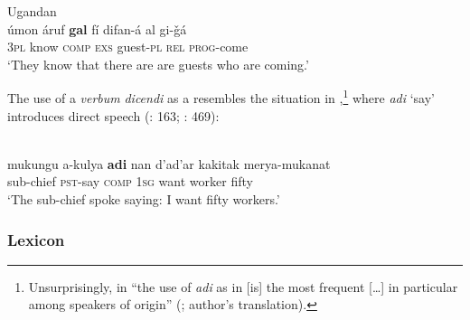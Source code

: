\documentclass[output=paper]{langsci/langscibook}
\begin{document}
\ex
Ugandan  \citep[204]{Wellens2003}\\
\gll     úmon áruf \textbf{gal} fí difan-á al gi-ǧá\\
         3\textsc{pl} know \textsc{comp} \textsc{exs} guest-\textsc{pl} \textsc{rel} \textsc{prog}-come\\
\glt    `They know that there are are guests who are coming.' 
\z
\z

The use of a \textit{verbum} \textit{dicendi} as a  resembles the situation in ,\footnote{Unsurprisingly, in   “the use of \textit{adi} as in  [is] the most frequent […] in particular among speakers of  origin” (\citealt[470]{Miller2001}; author's translation).} where \textit{adi} ‘say’ introduces direct speech (\citealt{Owens1997}: 163; \citealt{Miller2001}: 469): 

\ea

{ \citep[469]{Miller2001}}\\
\gll    mukungu a-kulya \textbf{adi} nan d'ad'ar kakitak merya-mukanat\\
                sub-chief \textsc{pst}-say \textsc{comp} 1\textsc{sg} want worker fifty\\
\glt     `The sub-chief spoke saying: I want fifty workers.'
\z


 \subsubsection{Lexicon}
\end{document}
